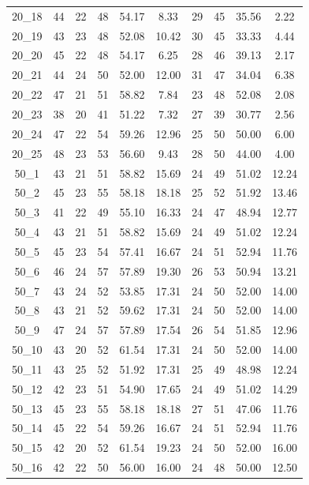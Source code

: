 \documentclass[a4paper,final]{article}
\begin{document}
\begin{longtable}[c]{cccccccccc}
20\_18  & 44  & 22 & 48  & 54.17 & 8.33  & 29  & 45  & 35.56 & 2.22  \\
20\_19  & 43  & 23 & 48  & 52.08 & 10.42 & 30  & 45  & 33.33 & 4.44  \\
20\_20  & 45  & 22 & 48  & 54.17 & 6.25  & 28  & 46  & 39.13 & 2.17  \\
20\_21  & 44  & 24 & 50  & 52.00 & 12.00 & 31  & 47  & 34.04 & 6.38  \\
20\_22  & 47  & 21 & 51  & 58.82 & 7.84  & 23  & 48  & 52.08 & 2.08  \\
20\_23  & 38  & 20 & 41  & 51.22 & 7.32  & 27  & 39  & 30.77 & 2.56  \\
20\_24  & 47  & 22 & 54  & 59.26 & 12.96 & 25  & 50  & 50.00 & 6.00  \\
20\_25  & 48  & 23 & 53  & 56.60 & 9.43  & 28  & 50  & 44.00 & 4.00  \\
50\_1   & 43  & 21 & 51  & 58.82 & 15.69 & 24  & 49  & 51.02 & 12.24 \\
50\_2   & 45  & 23 & 55  & 58.18 & 18.18 & 25  & 52  & 51.92 & 13.46 \\
50\_3   & 41  & 22 & 49  & 55.10 & 16.33 & 24  & 47  & 48.94 & 12.77 \\
50\_4   & 43  & 21 & 51  & 58.82 & 15.69 & 24  & 49  & 51.02 & 12.24 \\
50\_5   & 45  & 23 & 54  & 57.41 & 16.67 & 24  & 51  & 52.94 & 11.76 \\
50\_6   & 46  & 24 & 57  & 57.89 & 19.30 & 26  & 53  & 50.94 & 13.21 \\
50\_7   & 43  & 24 & 52  & 53.85 & 17.31 & 24  & 50  & 52.00 & 14.00 \\
50\_8   & 43  & 21 & 52  & 59.62 & 17.31 & 24  & 50  & 52.00 & 14.00 \\
50\_9   & 47  & 24 & 57  & 57.89 & 17.54 & 26  & 54  & 51.85 & 12.96 \\
50\_10  & 43  & 20 & 52  & 61.54 & 17.31 & 24  & 50  & 52.00 & 14.00 \\
50\_11  & 43  & 25 & 52  & 51.92 & 17.31 & 25  & 49  & 48.98 & 12.24 \\
50\_12  & 42  & 23 & 51  & 54.90 & 17.65 & 24  & 49  & 51.02 & 14.29 \\
50\_13  & 45  & 23 & 55  & 58.18 & 18.18 & 27  & 51  & 47.06 & 11.76 \\
50\_14  & 45  & 22 & 54  & 59.26 & 16.67 & 24  & 51  & 52.94 & 11.76 \\
50\_15  & 42  & 20 & 52  & 61.54 & 19.23 & 24  & 50  & 52.00 & 16.00 \\
50\_16  & 42  & 22 & 50  & 56.00 & 16.00 & 24  & 48  & 50.00 & 12.50 \\

\end{longtable}
\end{document}
